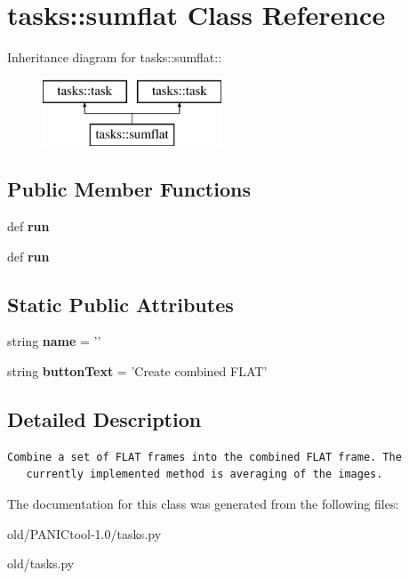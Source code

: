 \section{tasks::sumflat Class Reference}
\label{classtasks_1_1sumflat}
Inheritance diagram for tasks::sumflat::\begin{figure}[H]
\begin{center}
\leavevmode
\includegraphics[height=2cm]{classtasks_1_1sumflat}
\end{center}
\end{figure}
\subsection*{Public Member Functions}
\begin{CompactItemize}
\item 
def \textbf{run}\label{classtasks_1_1sumflat_dcb4128b123f41178db6b333be3d7f2b}

\item 
def \textbf{run}\label{classtasks_1_1sumflat_dcb4128b123f41178db6b333be3d7f2b}

\end{CompactItemize}
\subsection*{Static Public Attributes}
\begin{CompactItemize}
\item 
string \textbf{name} = '{\bfsumflat}'\label{classtasks_1_1sumflat_bef7b115eafa9c85d54d98b6152616be}

\item 
string \textbf{button\-Text} = 'Create combined FLAT'\label{classtasks_1_1sumflat_07e6378f44986d26d46d9defba1325b7}

\end{CompactItemize}


\subsection{Detailed Description}


\footnotesize\begin{verbatim}Combine a set of FLAT frames into the combined FLAT frame. The
   currently implemented method is averaging of the images.
\end{verbatim}
\normalsize
 



The documentation for this class was generated from the following files:\begin{CompactItemize}
\item 
old/PANICtool-1.0/tasks.py\item 
old/tasks.py\end{CompactItemize}
